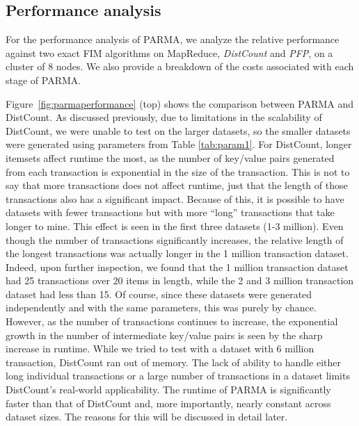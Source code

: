 \subsection{Performance analysis} 

For the performance analysis of PARMA, we analyze the relative
performance against two exact FIM algorithms on MapReduce,
\emph{DistCount} and \emph{PFP}, on a cluster of 8 nodes. We also provide a breakdown of the costs
associated with each stage of PARMA.


Figure~\ref{fig:parmaperformance} (top) shows the comparison
between PARMA and DistCount.
As discussed previously, due to
limitations in the scalability of DistCount, we were unable to test on
the larger datasets, so the smaller datasets were generated using
parameters from Table \ref{tab:param1}. 
For DistCount,
longer itemsets affect runtime the most, as
the number of key/value pairs generated from each transaction is
exponential in the size of the transaction. This is not to say that more
transactions does not affect runtime, just that the length of those
transactions also has a significant impact. Because of this, it is
possible to have datasets with fewer transactions but with more ``long''
transactions that take longer to mine. This effect is seen in the first
three datasets (1-3 million). Even though the number of transactions
significantly increases, the relative length of the longest transactions
was actually longer in the 1 million transaction dataset. Indeed, upon
further inspection, we found that the 1 million transaction dataset had
25 transactions over 20 items in length, while the 2 and 3 million
transaction dataset had less than 15. 
Of course, since these datasets
were generated independently and with the same parameters,
this was purely by chance. However, as the number of transactions continues to
increase, the exponential growth in the number of intermediate key/value
pairs is seen by the sharp increase in runtime. While we tried to test
with a dataset with 6 million transaction, DistCount ran out of memory.
The lack of ability to handle either long individual transactions or a
large number of transactions in a dataset limits DistCount's
real-world applicability. The runtime of PARMA is significantly faster
than that of DistCount and, more importantly, nearly constant across
dataset sizes. The reasons for this will be discussed in detail later.

